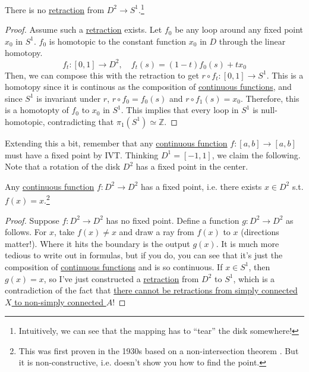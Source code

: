   \begin{theorem}
    \label{thm:unit-disk-to-circular-boundary}
		There is no \hyperref[def:retraction]{retraction} from $D^2 \to S^1$.\footnote{Intuitively, we can see that the mapping has to ``tear'' the disk somewhere!}
  \end{theorem}
  \begin{proof}
		Assume such a \hyperref[def:retraction]{retraction} exists. Let $f_0$ be any loop around any fixed point $x_0$ in $S^1$. $f_0$ is homotopic to the constant function $x_0$ in $D$ through the linear homotopy. 
		\begin{equation}
			f_t: [0, 1] \to D^2, \quad f_t (s) = (1 - t) f_0(s) + t x_0
		\end{equation}
		Then, we can compose this with the retraction to get $r \circ f_t : [0, 1] \to S^1$. This is a homotopy since it is continous as the composition of \hyperref[pst-def:continuous_func]{continuous functions}, and since $S^1$ is invariant under $r$, $r \circ f_0 = f_0 (s)$ and $r \circ f_1 (s) = x_0$. Therefore, this is a homotopty of $f_0$ to $x_0$ in $S^1$. This implies that every loop in $S^1$ is null-homotopic, contradicting that $\pi_1 (S^1) \simeq \mathbb{Z}$. 
  \end{proof}

  Extending this a bit, remember that any \hyperref[pst-def:continuous_func]{continuous function} $f: [a, b] \to [a, b]$ must have a fixed point by IVT. Thinking $D^1 = [-1, 1]$, we claim the following. Note that a rotation of the disk $D^2$ has a fixed point in the center. 

  \begin{theorem}
    \label{thm:browers-fixed-point-theorem}
    Any \hyperref[pst-def:continuous_func]{continuous function} $f: D^2 \to D^2$ has a fixed point, i.e. there exists $x \in D^2$ s.t. $f(x) = x$.\footnote{This was first proven in the 1930s based on a non-intersection theorem . But it is non-constructive, i.e. doesn't show you how to find the point. }
  \end{theorem}
  \begin{proof}
		Suppose $f: D^2 \to D^2$ has no fixed point. Define a function $g: D^2 \to D^2$ as follows. For $x$, take $f(x) \neq x$ and draw a ray from $f(x)$ to $x$ (directions matter!). Where it hits the boundary is the output $g(x)$. It is much more tedious to write out in formulas, but if you do, you can see that it's just the composition of \hyperref[pst-def:continuous_func]{continuous functions} and is so continuous. If $x \in S^1$, then $g(x) = x$, so I've just constructed a \hyperref[def:retraction]{retraction} from $D^2$ to $S^1$, which is a contradiction of the fact that \href{thm:no_retraction}{there cannot be retractions from \hyperref[def:simply-connected]{simply connected} $X$ to non-simply connected $A$}! 
  \end{proof}

